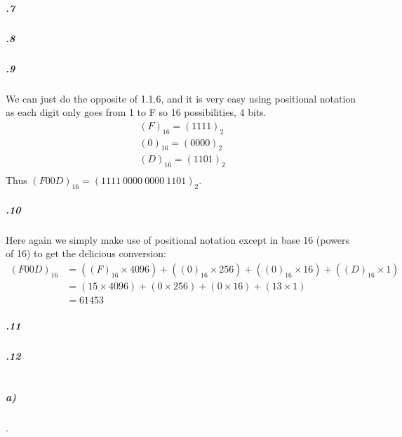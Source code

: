 \documentclass[11pt,letterpaper]{article}
\begin{document}
		\subparagraph{.7}
		
		\subparagraph{.8}
		
		\subparagraph{.9}
		We can just do the opposite of 1.1.6, and it is very easy using positional notation as each digit only goes from 1 to F so 16 possibilities, 4 bits.
		\begin{align*}
		(F)_{16} = (1111)_2\\
		(0)_{16} = (0000)_2\\
		(D)_{16} = (1101)_2\\
		\end{align*}
		Thus $(F00D)_{16} = (1111\ 0000\ 0000\ 1101)_2$.
		
		\subparagraph{.10}
		Here again we simply make use of positional notation except in base 16 (powers of 16) to get the delicious conversion:
		\begin{align*}
		(F00D)_16 &= ((F)_{16} \times 4096) + ((0)_{16} \times 256) + ((0)_{16} \times 16) + ((D)_{16} \times 1)\\
		&= (15 \times 4096) + (0 \times 256) + (0 \times 16) + (13 \times 1)\\
		&= 61 453
		\end{align*}
		
		\subparagraph{.11}
		
		\subparagraph{.12}
		
		
	\section{}
	
		\subparagraph{a)}
		.
		
\end{document}
